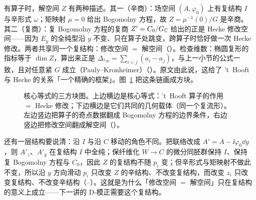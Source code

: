 有算子时，解空间 $Z$ 有两种描述。其一（辛商）：场空间 $(A,\varphi_0)$ 上有复结构 $I$ 与辛形式 $\omega$；矩映射 $\mu=0$ 给出 Bogomolny 方程，故 $Z=\mu^{-1}(0)/G$ 是辛商。其二（复商）：复 Bogomolny 方程的复商 $Z'=C_0/G_{\mathbb{C}}$ 给出的正是 Hecke 修改空间——因为 $E_y$ 的全纯型沿 $y$ 不变、只在算子处跳变，跨算子时恰好做一次 Hecke 修改。两者共享同一个复结构：修改空间 $=$ 解空间（）。检查维数：椭圆复形的指标等于 $\dim Z$，算出来正是 $\Delta_{{}^{L}w}=\sum_{i<j}(a_i-a_j)$，与上一小节的公式一致，且对任意紧 $G$ 成立（Pauly--Kronheimer）（）。原文由此说，这给了 't~Hooft 与 Hecke 的关系「一个精确的框架」。图~\ref{fig:chain} 把这条链画成方块。

\begin{figure}[htbp]
\centering
{}
\caption{核心等式的三方块图。上边横边是核心等式：'t~Hooft 算子的作用 $=$ Hecke 修改；下边横边是它们共同的几何载体（同一个复流形）。左边竖边把算子的奇点数据翻成 Bogomolny 方程的边界条件，右边竖边把修改空间翻成解空间（）。}
\label{fig:chain}
\end{figure}

还有一层结构要说清：沿 $I$ 与沿 $C$ 移动的角色不同。把联络改成 $A'=A-\ii\varphi_0\dd y$，则 $A'_z$、$A'_y$ 在复结构 $I$ 中全纯；保纤维化 $W\to C$ 的微分同胚群保持 $I$、保持复 Bogomolny 方程与 $C_0$，因此 $Z$ 的复结构不随 $p_i$ 变；但辛形式与矩映射不做此不变，所以沿 $y$ 方向滑动 $p_i$ 只改变 $Z$ 的辛结构、不改变复结构，而改变 $z_i$ 只改变复结构、不改变辛结构（--）。这就是为什么「修改空间 $=$ 解空间」只在复结构的意义上成立——下一讲的 D-模正需要这个复结构。

